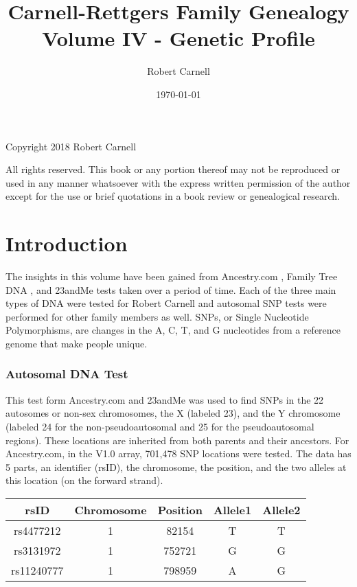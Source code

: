 \documentclass[11pt,letter]{book}
\title{\bf Carnell-Rettgers Family Genealogy \\
       \large Volume IV - Genetic Profile}
\author{Robert Carnell}
\date{\today}
\begin{document}
\frontmatter
\maketitle
\clearpage

\begingroup
\parindent 0pt
\parskip
\baselineskip
Copyright \textcopyright{} 2018 Robert Carnell

All rights reserved.  This book or any portion thereof may not be reproduced or used in any manner whatsoever with the express written permission of the author except for the use or brief quotations in a book review or genealogical research.
\endgroup
\clearpage

\tableofcontents
\mainmatter

\chapter{Introduction}

The insights in this volume have been gained from Ancestry.com , Family Tree DNA , and 23andMe  tests taken over a period of time.  Each of the three main types of DNA were tested for Robert Carnell and autosomal SNP tests were performed for other family members as well.  SNPs, or Single Nucleotide Polymorphisms, are changes in the A, C, T, and G nucleotides from a reference genome that make people unique.

\subsection{Autosomal DNA Test}

This test form Ancestry.com and 23andMe was used to find SNPs in the 22 autosomes or non-sex chromosomes, the X (labeled 23), and the Y chromosome (labeled 24 for the non-pseudoautosomal and 25 for the pseudoautosomal regions).  These locations are inherited from both parents and their ancestors.  For Ancestry.com, in the V1.0 array, 701,478 SNP locations were tested.  The data has 5 parts, an identifier (rsID), the chromosome, the position, and the two alleles at this location (on the forward strand).

\begin{center}
\begin{tabular}{c | c | c | c | c}
	rsID & Chromosome & Position & Allele1 & Allele2 \\
	\hline
	rs4477212 & 1 & 82154 & T & T \\
	rs3131972 & 1 & 752721 & G & G \\
	rs11240777 & 1 & 798959 & A & G \\
\end{tabular}
\end{center}
\end{document}
